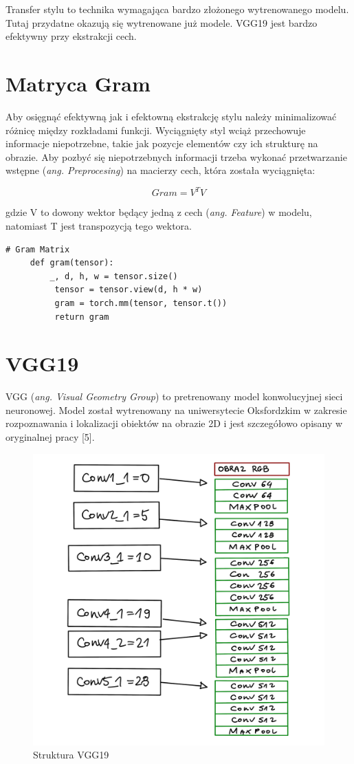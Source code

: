 \documentclass[brudnopis]{xmgr}
\begin{document}
Transfer stylu to technika wymagająca bardzo złożonego wytrenowanego modelu. Tutaj przydatne okazują się wytrenowane już modele. VGG19 jest bardzo efektywny przy ekstrakcji cech.

\section{Matryca Gram\label{s:dsssl}}
Aby osięgnąć efektywną jak i efektowną ekstrakcję stylu należy minimalizować różnicę między rozkładami funkcji. Wyciągnięty styl wciąż przechowuje informacje niepotrzebne, takie jak pozycje elementów czy ich strukturę na obrazie. Aby pozbyć się niepotrzebnych informacji trzeba wykonać przetwarzanie wstępne (\textit{ang. Preprocesing}) na macierzy cech, która została wyciągnięta:

\begin{equation}
Gram = V^TV
\end{equation}

gdzie V to dowony wektor będący jedną z cech (\textit{ang. Feature}) w modelu, natomiast T jest transpozycją tego wektora. 
\begin{lstlisting}
# Gram Matrix
	 def gram(tensor):
	 	 _, d, h, w = tensor.size()
          tensor = tensor.view(d, h * w)
          gram = torch.mm(tensor, tensor.t())
          return gram
\end{lstlisting}


\section{VGG19\label{s:dsssl}}

VGG (\textit{ang. Visual Geometry Group}) to pretrenowany model konwolucyjnej sieci neuronowej. 
Model został wytrenowany na uniwersytecie Oksfordzkim w zakresie rozpoznawania i lokalizacji obiektów na obrazie 2D i jest szczegółowo opisany w oryginalnej pracy [5].

\begin{figure}[!tbh]
\centering
\includegraphics[width=.8\hsize]{fig/7}
\caption{Struktura VGG19\label{RYS.4}}
\end{figure}
\end{document}
